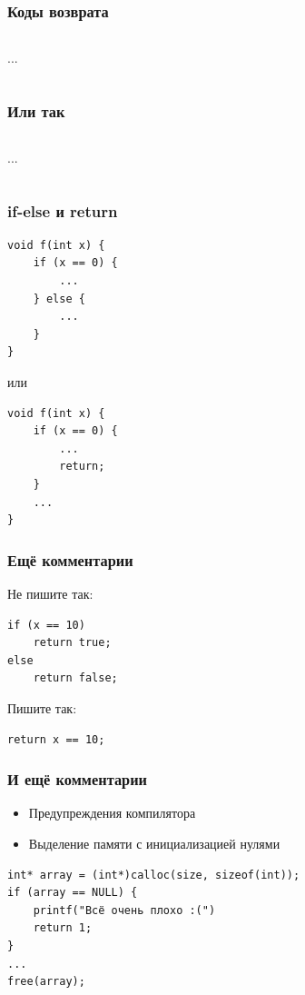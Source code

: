 \documentclass[aspectratio=169]{beamer}
\begin{document}
\begin{frame}
    \frametitle{Коды возврата}
    \begin{scriptsize}
        \inputminted[firstline=2, lastline=16]{c}{fib1.c}
        ...
        \inputminted[firstline=21, lastline=26]{c}{fib1.c}
    \end{scriptsize}
\end{frame}

\begin{frame}
    \frametitle{Или так}
    \begin{scriptsize}
        \inputminted[firstline=2, lastline=13]{c}{fib2.c}
        ...
        \inputminted[firstline=17, lastline=22]{c}{fib2.c}
    \end{scriptsize}
\end{frame}

\begin{frame}[fragile]
    \frametitle{if-else и return}
    \begin{verbatim}
void f(int x) {
    if (x == 0) {
        ...
    } else {
        ...
    }
}
        \end{verbatim}
    или
    \begin{verbatim}
void f(int x) {
    if (x == 0) {
        ...
        return;
    }
    ...
}
        \end{verbatim}
\end{frame}

\begin{frame}[fragile]
    \frametitle{Ещё комментарии}
    Не пишите так:
    \begin{verbatim}
if (x == 10)
    return true;
else
    return false;
        \end{verbatim}
    Пишите так:
    \begin{verbatim}
return x == 10;
        \end{verbatim}
\end{frame}

\begin{frame}[fragile]
    \frametitle{И ещё комментарии}
    \begin{itemize}
        \item Предупреждения компилятора
        \item Выделение памяти с инициализацией нулями
    \end{itemize}
    \begin{verbatim}
int* array = (int*)calloc(size, sizeof(int));
if (array == NULL) {
    printf("Всё очень плохо :(")
    return 1;
}
...
free(array);
        \end{verbatim}
\end{frame}
\end{document}
